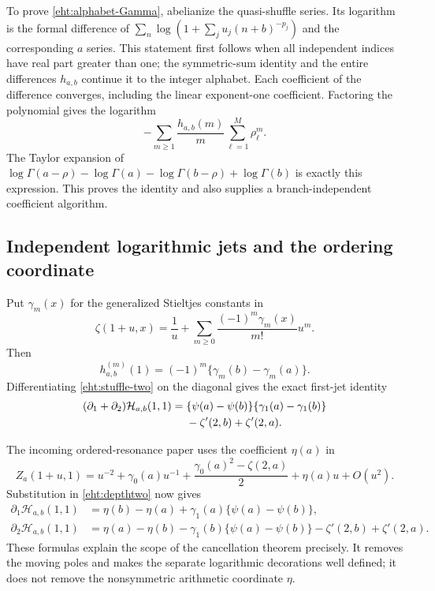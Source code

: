 To prove \eqref{eht:alphabet-Gamma}, abelianize the quasi-shuffle series.
Its logarithm is the formal difference of
$\sum_n\log(1+\sum_ju_j(n+b)^{-p_j})$ and the corresponding $a$ series.
This statement first follows when all independent indices have real part
greater than one; the symmetric-sum identity and the entire differences
$h_{a,b}$ continue it to the integer alphabet.  Each coefficient of the
difference converges, including the linear exponent-one coefficient.
Factoring the polynomial gives the logarithm
\[
 -\sum_{m\ge1}\frac{h_{a,b}(m)}m
                     \sum_{\ell=1}^M\rho_\ell^m.
\]
The Taylor expansion of
$\log\Gamma(a-\rho)-\log\Gamma(a)
 -\log\Gamma(b-\rho)+\log\Gamma(b)$ is exactly this expression.
This proves the identity and also supplies a branch-independent
coefficient algorithm.

\subsection{Independent logarithmic jets and the ordering coordinate}

Put $\gamma_m(x)$ for the generalized Stieltjes constants in
\[
 \zeta(1+u,x)=\frac1u+
       \sum_{m\ge0}\frac{(-1)^m\gamma_m(x)}{m!}u^m.
\]
Then
\begin{equation}\label{eht:h-jets}
 h_{a,b}^{(m)}(1)=(-1)^m\{\gamma_m(b)-\gamma_m(a)\}.
\end{equation}
Differentiating \eqref{eht:stuffle-two} on the diagonal gives the exact
first-jet identity
\begin{align}\label{eht:sum-jets}
 (\partial_1+\partial_2)\mathcal H_{a,b}(1,1)
  ={}&\{\psi(a)-\psi(b)\}\{\gamma_1(a)-\gamma_1(b)\}\notag\\
    &-\zeta'(2,b)+\zeta'(2,a).
\end{align}

The incoming ordered-resonance paper uses the coefficient $\eta(a)$ in
\[
 Z_a(1+u,1)=u^{-2}+\gamma_0(a)u^{-1}
       +\frac{\gamma_0(a)^2-\zeta(2,a)}2+\eta(a)u+O(u^2).
\]
Substitution in \eqref{eht:depthtwo} now gives
\begin{align}
 \partial_1\mathcal H_{a,b}(1,1)
   &=\eta(b)-\eta(a)+\gamma_1(a)\{\psi(a)-\psi(b)\},
       \label{eht:first-eta}\\
 \partial_2\mathcal H_{a,b}(1,1)
   &=\eta(a)-\eta(b)-\gamma_1(b)\{\psi(a)-\psi(b)\}
                     -\zeta'(2,b)+\zeta'(2,a).
       \label{eht:second-eta}
\end{align}
These formulas explain the scope of the cancellation theorem precisely.
It removes the moving poles and makes the separate logarithmic
decorations well defined; it does not remove the nonsymmetric arithmetic
coordinate $\eta$.


